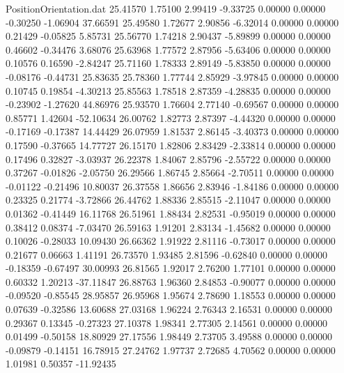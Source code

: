 \begin{filecontents}{PositionOrientation.dat}
  25.41570    1.75100    2.99419    -9.33725    0.00000    0.00000   -0.30250   -1.06904   37.66591
  25.49580    1.72677    2.90856    -6.32014    0.00000    0.00000    0.21429   -0.05825    5.85731
  25.56770    1.74218    2.90437    -5.89899    0.00000    0.00000    0.46602   -0.34476    3.68076
  25.63968    1.77572    2.87956    -5.63406    0.00000    0.00000    0.10576    0.16590   -2.84247
  25.71160    1.78333    2.89149    -5.83850    0.00000    0.00000   -0.08176   -0.44731   25.83635
  25.78360    1.77744    2.85929    -3.97845    0.00000    0.00000    0.10745    0.19854   -4.30213
  25.85563    1.78518    2.87359    -4.28835    0.00000    0.00000   -0.23902   -1.27620   44.86976
  25.93570    1.76604    2.77140    -0.69567    0.00000    0.00000    0.85771    1.42604  -52.10634
  26.00762    1.82773    2.87397    -4.44320    0.00000    0.00000   -0.17169   -0.17387   14.44429
  26.07959    1.81537    2.86145    -3.40373    0.00000    0.00000    0.17590   -0.37665   14.77727
  26.15170    1.82806    2.83429    -2.33814    0.00000    0.00000    0.17496    0.32827   -3.03937
  26.22378    1.84067    2.85796    -2.55722    0.00000    0.00000    0.37267   -0.01826   -2.05750
  26.29566    1.86745    2.85664    -2.70511    0.00000    0.00000   -0.01122   -0.21496   10.80037
  26.37558    1.86656    2.83946    -1.84186    0.00000    0.00000    0.23325    0.21774   -3.72866
  26.44762    1.88336    2.85515    -2.11047    0.00000    0.00000    0.01362   -0.41449   16.11768
  26.51961    1.88434    2.82531    -0.95019    0.00000    0.00000    0.38412    0.08374   -7.03470
  26.59163    1.91201    2.83134    -1.45682    0.00000    0.00000    0.10026   -0.28033   10.09430
  26.66362    1.91922    2.81116    -0.73017    0.00000    0.00000    0.21677    0.06663    1.41191
  26.73570    1.93485    2.81596    -0.62840    0.00000    0.00000   -0.18359   -0.67497   30.00993
  26.81565    1.92017    2.76200     1.77101    0.00000    0.00000    0.60332    1.20213  -37.11847
  26.88763    1.96360    2.84853    -0.90077    0.00000    0.00000   -0.09520   -0.85545   28.95857
  26.95968    1.95674    2.78690     1.18553    0.00000    0.00000    0.07639   -0.32586   13.60688
  27.03168    1.96224    2.76343     2.16531    0.00000    0.00000    0.29367    0.13345   -0.27323
  27.10378    1.98341    2.77305     2.14561    0.00000    0.00000    0.01499   -0.50158   18.80929
  27.17556    1.98449    2.73705     3.49588    0.00000    0.00000   -0.09879   -0.14151   16.78915
  27.24762    1.97737    2.72685     4.70562    0.00000    0.00000    1.01981    0.50357  -11.92435

\end{filecontents}
